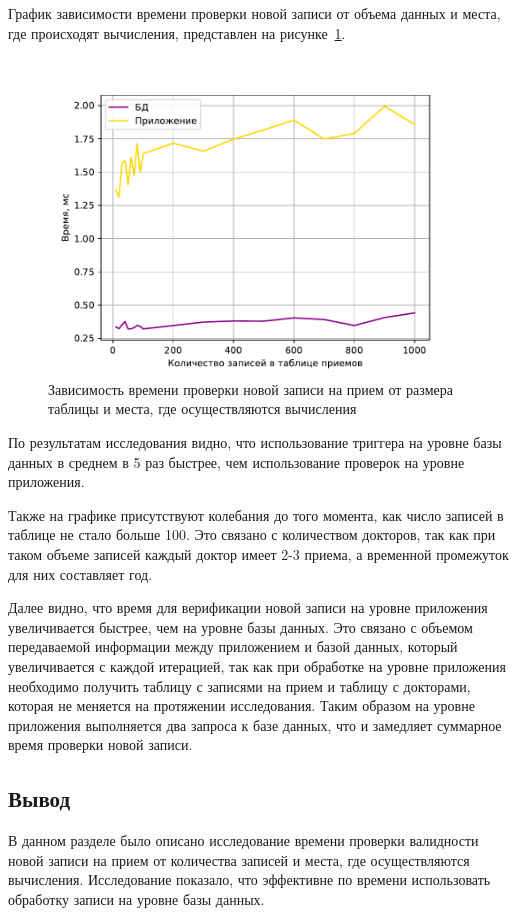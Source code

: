 График зависимости времени проверки новой записи от объема данных и места, где происходят вычисления, представлен на рисунке~\ref{graph}.
\begin{figure}[!h]
	\centering
	\includegraphics[width=160mm]{image/resultGraph}
	\caption{Зависимость времени проверки новой записи на прием от размера таблицы и места, где осуществляются вычисления}
	\label{graph}
\end{figure}

По результатам исследования видно, что использование триггера на уровне базы данных в среднем в 5 раз быстрее, чем использование проверок на уровне приложения. 

Также на графике присутствуют колебания до того момента, как число записей в таблице не стало больше 100. Это связано с количеством докторов, так как при таком объеме записей каждый доктор имеет 2-3 приема, а временной промежуток для них составляет год. 

Далее видно, что время для верификации новой записи на уровне приложения увеличивается быстрее, чем на уровне базы данных. Это связано с объемом передаваемой информации между приложением и базой данных, который увеличивается с каждой итерацией, так как при обработке на уровне приложения необходимо получить таблицу с записями на прием и таблицу с докторами, которая не меняется на протяжении исследования. Таким образом на уровне приложения выполняется два запроса к базе данных, что и замедляет суммарное время проверки новой записи. 


\subsection*{Вывод}
В данном разделе было описано исследование времени проверки валидности новой записи на прием от количества записей и места, где осуществляются вычисления. Исследование показало, что эффективне по времени использовать обработку записи на уровне базы данных.


